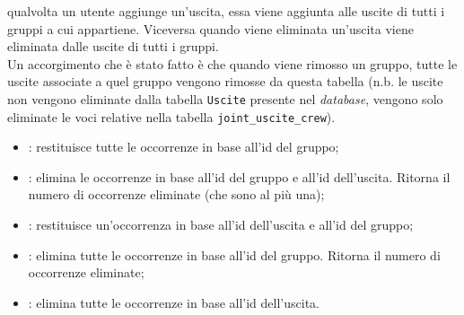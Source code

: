 qualvolta un utente aggiunge un'uscita, essa viene aggiunta alle uscite di
tutti i gruppi a cui appartiene. Viceversa quando viene eliminata un'uscita
viene eliminata dalle uscite di tutti i gruppi.\\
Un accorgimento che è stato fatto è che quando viene rimosso un gruppo, tutte
le uscite associate a quel gruppo vengono rimosse da questa tabella (n.b. le
uscite non vengono eliminate dalla tabella \texttt{Uscite} presente nel
\textit{database}, vengono solo eliminate le voci relative nella tabella
\texttt{joint\_uscite\_crew}).
\begin{itemize}
    \item {}:
          restituisce tutte le occorrenze in base all'id del gruppo;
    \item {}:
          elimina le occorrenze in base all'id del gruppo e all'id dell'uscita.
          Ritorna
          il numero di occorrenze eliminate (che sono al più una);
    \item {}: restituisce un'occorrenza in base all'id dell'uscita e
          all'id del
          gruppo;
    \item {}: elimina tutte le occorrenze
          in base all'id del gruppo. Ritorna il numero di occorrenze eliminate;
    \item {}: elimina tutte le
          occorrenze in base all'id dell'uscita.
\end{itemize}

